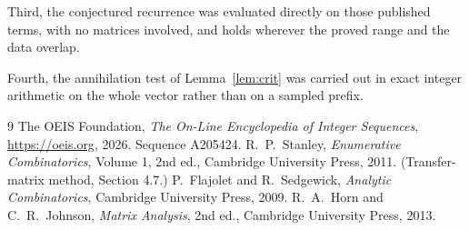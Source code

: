 \documentclass[11pt,a4paper]{article}
\theoremstyle{plain}
\theoremstyle{definition}
\begin{document}
Third, the conjectured recurrence was evaluated directly on those published terms, with no
matrices involved, and holds wherever the proved range and the data overlap.

Fourth, the annihilation test of Lemma~\ref{lem:crit} was carried out in exact integer
arithmetic on the whole vector rather than on a sampled prefix.

\begin{thebibliography}{9}
 The OEIS Foundation, \emph{The On-Line Encyclopedia of Integer
Sequences}, \url{https://oeis.org}, 2026. Sequence A205424.
 R.~P.~Stanley, \emph{Enumerative Combinatorics}, Volume 1, 2nd ed.,
Cambridge University Press, 2011. (Transfer-matrix method, Section 4.7.)
 P.~Flajolet and R.~Sedgewick, \emph{Analytic Combinatorics}, Cambridge
University Press, 2009.
 R.~A.~Horn and C.~R.~Johnson, \emph{Matrix Analysis}, 2nd ed., Cambridge
University Press, 2013.
\end{thebibliography}
\end{document}
